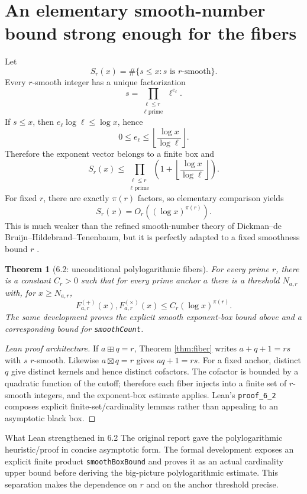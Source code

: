 \documentclass[11pt,a4paper,oneside,open=any,headings=small]{scrbook}
\newtheorem{theorem}{Theorem}[chapter]
\theoremstyle{definition}
\newcommand{\lean}[1]{\ifmmode\text{\texttt{\detokenize{#1}}}\else\nolinkurl{#1}\fi}
\begin{document}
\section{An elementary smooth-number bound strong enough for the fibers}
Let
\[
S_r(x)=\#\{s\le x:s\text{ is $r$-smooth}\}.
\]
Every $r$-smooth integer has a unique factorization
\[
s=\prod_{\substack{\ell\le r\\ \ell\text{ prime}}}\ell^{e_\ell}.
\]
If $s\le x$, then $e_\ell\log\ell\le\log x$, hence
\[
0\le e_\ell\le \left\lfloor\frac{\log x}{\log\ell}\right\rfloor.
\]
Therefore the exponent vector belongs to a finite box and
\[
S_r(x)\le
\prod_{\substack{\ell\le r\\\ell\text{ prime}}}
\left(1+\left\lfloor\frac{\log x}{\log\ell}\right\rfloor\right).
\]
For fixed $r$, there are exactly $\pi(r)$ factors, so elementary comparison yields
\[
S_r(x)=O_r\!\left((\log x)^{\pi(r)}\right).
\]
This is much weaker than the refined smooth-number theory of Dickman--de Bruijn--Hildebrand--Tenenbaum, but it is perfectly adapted to a fixed smoothness bound $r$ \parencite{Dickman1930,deBruijn1951,HildebrandTenenbaum1993}.

\begin{theorem}[6.2: unconditional polylogarithmic fibers]\label{thm:62}
For every prime $r$, there is a constant $C_r>0$ such that for every prime anchor $a$ there is a threshold $N_{a,r}$ with, for $x\ge N_{a,r}$,
\[
F^{(+)}_{a,r}(x),F^{(\times)}_{a,r}(x)
\le C_r(\log x)^{\pi(r)}.
\]
The same development proves the explicit smooth exponent-box bound above and a corresponding bound for \lean{smoothCount}.
\end{theorem}

\begin{proof}[Lean proof architecture]
If $a\boxplus q=r$, Theorem \ref{thm:fiber} writes $a+q+1=rs$ with $s$ $r$-smooth. Likewise $a\boxtimes q=r$ gives $aq+1=rs$. For a fixed anchor, distinct $q$ give distinct kernels and hence distinct cofactors. The cofactor is bounded by a quadratic function of the cutoff; therefore each fiber injects into a finite set of $r$-smooth integers, and the exponent-box estimate applies. Lean's \lean{proof_6_2} composes explicit finite-set/cardinality lemmas rather than appealing to an asymptotic black box.
\end{proof}

\begin{statusbox}{What Lean strengthened in 6.2}
The original report gave the polylogarithmic heuristic/proof in concise asymptotic form. The formal development exposes an explicit finite product \lean{smoothBoxBound} and proves it as an actual cardinality upper bound before deriving the big-picture polylogarithmic estimate. This separation makes the dependence on $r$ and on the anchor threshold precise.
\end{statusbox}
\end{document}
